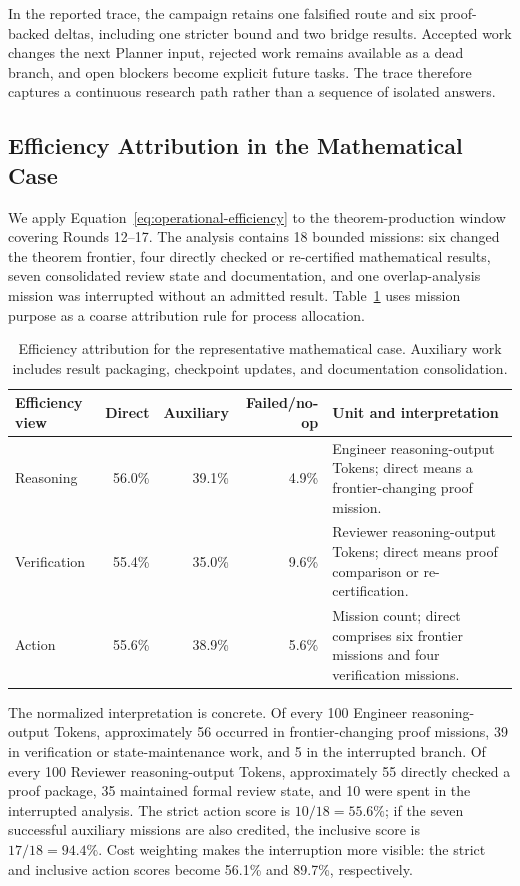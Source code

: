 In the reported trace, the campaign retains one falsified route and six proof-backed
deltas, including one stricter bound and two bridge results. Accepted work changes
the next Planner input, rejected work remains available as a dead branch, and open
blockers become explicit future tasks. The trace therefore captures a continuous
research path rather than a sequence of isolated answers.

\subsection{Efficiency Attribution in the Mathematical Case}

We apply Equation~\ref{eq:operational-efficiency} to the theorem-production
window covering Rounds 12--17. The analysis contains 18 bounded missions: six changed
the theorem frontier, four directly checked or re-certified mathematical results,
seven consolidated review state and documentation, and one overlap-analysis mission was interrupted
without an admitted result. Table~\ref{tab:erdos-efficiency} uses mission purpose as
a coarse attribution rule for process allocation.

\begin{table}[H]
\centering
\footnotesize
\renewcommand{\arraystretch}{1.12}
\begin{tabularx}{\linewidth}{@{}p{2.65cm}rrrX@{}}
\toprule
\rowcolor{papersand}
\textbf{Efficiency view} & \textbf{Direct} & \textbf{Auxiliary} & \textbf{Failed/no-op} & \textbf{Unit and interpretation} \\
\midrule
Reasoning & 56.0\% & 39.1\% & 4.9\% & Engineer reasoning-output Tokens; direct means a frontier-changing proof mission. \\
Verification & 55.4\% & 35.0\% & 9.6\% & Reviewer reasoning-output Tokens; direct means proof comparison or re-certification. \\
Action & 55.6\% & 38.9\% & 5.6\% & Mission count; direct comprises six frontier missions and four verification missions. \\
\bottomrule
\end{tabularx}
\caption{Efficiency attribution for the representative mathematical case.
Auxiliary work includes result packaging, checkpoint updates, and documentation
consolidation.}
\label{tab:erdos-efficiency}
\end{table}

The normalized interpretation is concrete. Of every 100 Engineer
reasoning-output Tokens, approximately 56 occurred in frontier-changing proof
missions, 39 in verification or state-maintenance work, and 5 in the interrupted
branch. Of every 100 Reviewer reasoning-output Tokens, approximately 55 directly
checked a proof package, 35 maintained formal review state, and 10 were
spent in the interrupted analysis. The strict action score is $10/18=55.6\%$; if the
seven successful auxiliary missions are also credited, the inclusive score is
$17/18=94.4\%$. Cost weighting makes the interruption more visible: the strict and
inclusive action scores become 56.1\% and 89.7\%, respectively.

